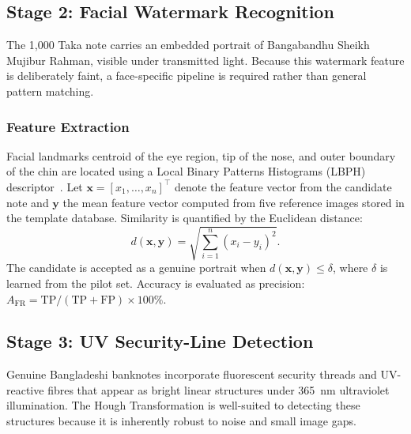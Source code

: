 \documentclass[journal]{IEEEtran}
\begin{document}
\subsection{Stage 2: Facial Watermark Recognition}
\label{subsec:face}

The 1,000 Taka note carries an embedded portrait of Bangabandhu Sheikh Mujibur Rahman, visible under transmitted light. Because this watermark feature is deliberately faint, a face-specific pipeline is required rather than general pattern matching.

\subsubsection{Feature Extraction}
Facial landmarks centroid of the eye region, tip of the nose, and outer boundary of the chin are located using a Local Binary Patterns Histograms (LBPH) descriptor~\cite{hasanuzzaman2012}. Let $\mathbf{x} = [x_1, \dots, x_n]^\top$ denote the feature vector from the candidate note and $\mathbf{y}$ the mean feature vector computed from five reference images stored in the template database. Similarity is quantified by the Euclidean distance:
\begin{equation}
  d(\mathbf{x},\mathbf{y}) = \sqrt{\sum_{i=1}^{n}(x_i - y_i)^2}.
  \label{eq:euclidean}
\end{equation}
The candidate is accepted as a genuine portrait when $d(\mathbf{x},\mathbf{y}) \leq \delta$, where $\delta$ is learned from the pilot set. Accuracy is evaluated as precision: $A_{\mathrm{FR}} = \mathrm{TP}/(\mathrm{TP}+\mathrm{FP}) \times 100\%$.

\subsection{Stage 3: UV Security-Line Detection}
\label{subsec:hough}

Genuine Bangladeshi banknotes incorporate fluorescent security threads and UV-reactive fibres that appear as bright linear structures under 365~nm ultraviolet illumination. The Hough Transformation is well-suited to detecting these structures because it is inherently robust to noise and small image gaps.
\end{document}
